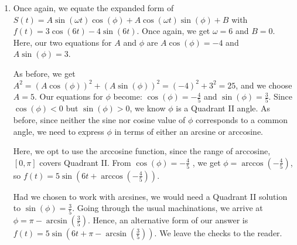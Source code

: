 \documentclass{ximera}
\begin{document}
\begin{example}
\begin{explanation}
\begin{enumerate}
 

In addition, the real number $t = \arcsin\left(\frac{4}{5}\right)$ satisfies $\sin(t) = \frac{4}{5}$ and $0 < t < \frac{\pi}{2}$.  Hence $\phi = \arcsin\left(\frac{4}{5}\right)$ radians is Quadrant I angle with  $\sin(\phi) = \frac{4}{5}$.  This means we could also take $\phi = \arcsin\left(\frac{4}{5}\right)$ and write $f(t) = 5 \cos\left(6t + \arcsin\left(\frac{4}{5}\right) \right)$.  (We could also express $\phi$ in terms of arctangents, if we wanted!)

 

We leave it to the reader to verify (both) solutions analytically and graphically.


\item Once again, we equate the expanded form of $S(t) = A \sin(\omega t) \cos(\phi) + A \cos(\omega t) \sin(\phi) + B$ with $f(t) = 3\cos(6t) -4 \sin(6t)$. Once again, we get  $\omega = 6$ and $B = 0$.  Here, our two equations for $A$ and $\phi$ are $A \cos(\phi) = -4$ and $A \sin(\phi) = 3$.

 

As before, we get $A^2 = (A \cos(\phi))^2 + (A \sin(\phi))^2 = (-4)^2 + 3^2 = 25$, and we choose $A = 5$. Our equations for $\phi$ become:  $\cos(\phi) = -\frac{4}{5}$ and $\sin(\phi) = \frac{3}{5}$.  Since $\cos(\phi)<0$ but $\sin(\phi) > 0$, we know $\phi$ is a Quadrant II angle. As before, since neither the sine nor cosine value of $\phi$ corresponds to a common angle, we need to express $\phi$ in terms of either an arcsine or arccosine.

 

Here, we opt to use the arccosine function, since the range of arccosine, $[0, \pi]$ covers Quadrant II.   From  $\cos(\phi) = -\frac{4}{5}$ , we get $\phi = \arccos\left(-\frac{4}{5}\right)$, so $f(t) = 5 \sin\left(6t + \arccos\left(-\frac{4}{5}\right) \right)$.  

 

Had we chosen to work with arcsines, we would need a Quadrant II solution to $\sin(\phi) = \frac{3}{5}$.  Going through the usual machinations, we arrive at $\phi = \pi - \arcsin\left( \frac{3}{5} \right)$.  Hence, an alternative form of our answer is $f(t) = 5 \sin \left( 6t +  \pi - \arcsin\left( \frac{3}{5} \right) \right)$.  We leave the checks to the reader.  

\end{enumerate}
\end{explanation}

\end{example}



\closegraphsfile
\end{document}
